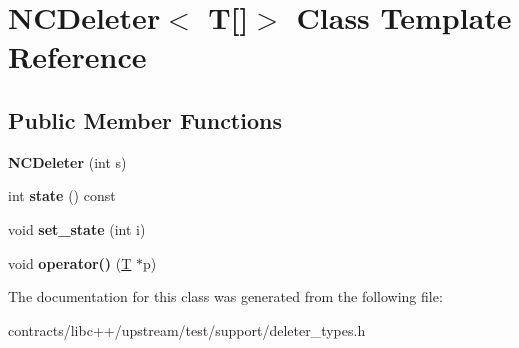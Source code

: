 \hypertarget{class_n_c_deleter_3_01_t[]_4}{}\section{N\+C\+Deleter$<$ T\mbox{[}\mbox{]}$>$ Class Template Reference}
\label{class_n_c_deleter_3_01_t[]_4}
\subsection*{Public Member Functions}
\begin{DoxyCompactItemize}
\item 
\mbox{\label{class_n_c_deleter_3_01_t[]_4_aff32fa96bb6a636a5ab676bfe3844a20}} 
{\bfseries N\+C\+Deleter} (int s)
\item 
\mbox{\label{class_n_c_deleter_3_01_t[]_4_ab6127e95f8b14818b7e6ec45d358e3f7}} 
int {\bfseries state} () const
\item 
\mbox{\label{class_n_c_deleter_3_01_t[]_4_a492fae974809fe056e091f5f7baeb596}} 
void {\bfseries set\+\_\+state} (int i)
\item 
\mbox{\label{class_n_c_deleter_3_01_t[]_4_a47f8121ff93487295c6623987531bebe}} 
void {\bfseries operator()} (\mbox{\hyperlink{struct_t}{T}} $\ast$p)
\end{DoxyCompactItemize}


The documentation for this class was generated from the following file\+:\begin{DoxyCompactItemize}
\item 
contracts/libc++/upstream/test/support/deleter\+\_\+types.\+h\end{DoxyCompactItemize}

